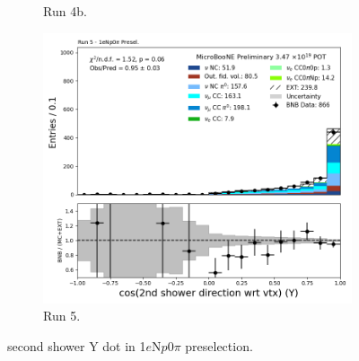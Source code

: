 \begin{figure}[H]
\begin{subfigure}[t]{0.32\linewidth}
        \caption{Run 4b.}
    \end{subfigure}%
    \hspace{0.2cm}%
    \begin{subfigure}[t]{0.32\linewidth}
        \includegraphics[width=\linewidth]{technote/Appendix_Preselection/Figures/1eNp0pi/Run5/secondshower_Y_dot_Run5_1eNp0pi_Presel.png}
        \caption{Run 5.}
    \end{subfigure}
    \caption{second shower Y dot in 1$e$N$p$0$\pi$ preselection.}
\end{figure}

